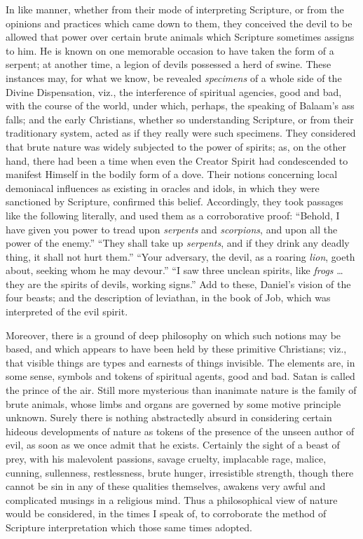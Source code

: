 In like manner, whether from their mode of interpreting Scripture,
or from the opinions and practices which came down to them, they
conceived the devil to be allowed that power over certain brute
animals which Scripture sometimes assigns to him. He is known on
one memorable occasion to have taken the form of a serpent; at another
time, a legion of devils possessed a herd of swine. These instances
may, for what we know, be revealed \emph{specimens} of a whole side of
the Divine Dispensation, viz., the interference of spiritual agencies,
good and bad, with the course of the world, under which, perhaps, the
speaking of Balaam's ass falls; and the early Christians, whether so
understanding Scripture, or from their traditionary system, acted as
if they really were such specimens. They considered that brute nature
was widely subjected to the power of spirits; as, on the other hand,
there had been a time when even the Creator Spirit had condescended to
manifest Himself in the bodily form of a dove. Their notions
concerning local demoniacal influences as existing in oracles and
idols, in which they were sanctioned by Scripture, confirmed this
belief. Accordingly, they took passages like the following literally,
and used them as a corroborative proof: ``Behold, I have given you
power to tread upon \emph{serpents} and \emph{scorpions}, and upon all
the power of the enemy.'' ``They shall take up \emph{serpents},
and if they drink any deadly thing, it shall not hurt them.''
``Your adversary, the devil, as a roaring \emph{lion}, goeth
about, seeking whom he may devour.'' ``I saw three unclean
spirits, like \emph{frogs} … they are the spirits of devils, working
signs.'' Add to these, Daniel's vision of the four beasts; and the
description of leviathan, in the book of Job, which was interpreted of
the evil spirit.

Moreover, there is a ground of deep philosophy on which such
notions may be based, and which appears to have been held by these
primitive Christians; viz., that visible things are types and earnests
of things invisible. The elements are, in some sense, symbols and
tokens of spiritual agents, good and bad. Satan is called the
prince of the air. Still more mysterious than inanimate nature is the
family of brute animals, whose limbs and organs are governed by some
motive principle unknown. Surely there is nothing abstractedly absurd
in considering certain hideous developments of nature as tokens of the
presence of the unseen author of evil, as soon as we once admit that
he exists. Certainly the sight of a beast of prey, with his malevolent
passions, savage cruelty, implacable rage, malice, cunning,
sullenness, restlessness, brute hunger, irresistible strength, though
there cannot be sin in any of these qualities themselves, awakens very
awful and complicated musings in a religious mind. Thus a
philosophical view of nature would be considered, in the times I speak
of, to corroborate the method of Scripture interpretation which those
same times adopted.

